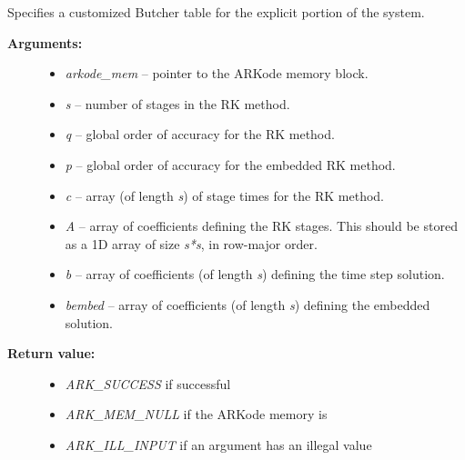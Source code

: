 \documentclass[letterpaper,10pt,english]{sphinxmanual}
\begin{document}
\begin{fulllineitems}
\label{c_interface/User_callable:ARKodeSetERKTable}
Specifies a customized Butcher table for the explicit portion of the system.
\begin{description}
\item[{\textbf{Arguments:}}] \leavevmode\begin{itemize}
\item {} 
\emph{arkode\_mem} -- pointer to the ARKode memory block.

\item {} 
\emph{s} -- number of stages in the RK method.

\item {} 
\emph{q} -- global order of accuracy for the RK method.

\item {} 
\emph{p} -- global order of accuracy for the embedded RK method.

\item {} 
\emph{c} -- array (of length \emph{s}) of stage times for the RK method.

\item {} 
\emph{A} -- array of coefficients defining the RK stages.  This should
be stored as a 1D array of size \emph{s*s}, in row-major order.

\item {} 
\emph{b} -- array of coefficients (of length \emph{s}) defining the time step solution.

\item {} 
\emph{bembed} -- array of coefficients (of length \emph{s}) defining the embedded solution.

\end{itemize}

\item[{\textbf{Return value:}}] \leavevmode\begin{itemize}
\item {} 
\emph{ARK\_SUCCESS} if successful

\item {} 
\emph{ARK\_MEM\_NULL} if the ARKode memory is 

\item {} 
\emph{ARK\_ILL\_INPUT} if an argument has an illegal value


\end{itemize}
\end{description}
\end{fulllineitems}
\end{document}
